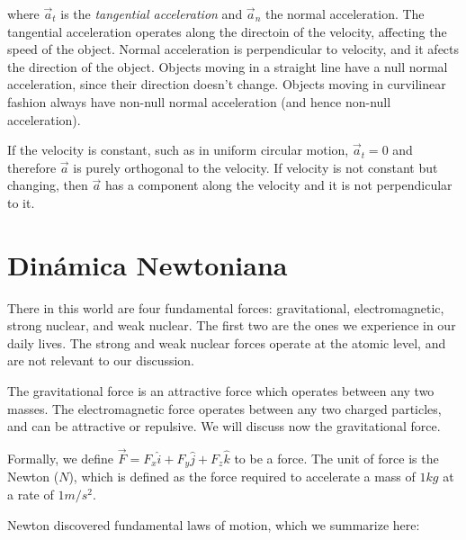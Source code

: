 \documentclass[12pt]{article}
\theoremstyle{definition}
\begin{document}
where $\vec{a}_t$ is the \textit{tangential acceleration} and $\vec{a}_n$ the
normal acceleration. The tangential acceleration operates along the directoin of
the velocity, affecting the speed of the object. Normal acceleration is
perpendicular to velocity, and it afects the direction of the object. Objects
moving in a straight line have a null normal acceleration, since their direction
doesn't change. Objects moving in curvilinear fashion always have non-null
normal acceleration (and hence non-null acceleration). 

If the velocity is constant, such as in uniform circular motion, $\vec{a}_t = 0$
and therefore $\vec{a}$ is purely orthogonal to the velocity. If velocity is
not constant but changing, then $\vec{a}$ has a component along the velocity and
it is not perpendicular to it.

\pagebreak

\section{Dinámica Newtoniana}

There in this world are four fundamental forces: gravitational, electromagnetic,
strong nuclear, and weak nuclear. The first two are the ones we experience in
our daily lives. The strong and weak nuclear forces operate at the atomic level,
and are not relevant to our discussion. 

The gravitational force is an attractive force which operates between any two
masses. The electromagnetic force operates between any two charged particles,
and can be attractive or repulsive. We will discuss now the gravitational force.

Formally, we define $\vec{F} = F_x \hat{i} + F_y \hat{j} + F_z \hat{k}$ to be a
force. The unit of force is the Newton ($N$), which is defined as the force
required to accelerate a mass of $1 kg$ at a rate of $1 m/s^2$.  

Newton discovered fundamental laws of motion, which we summarize here: 
\end{document}
